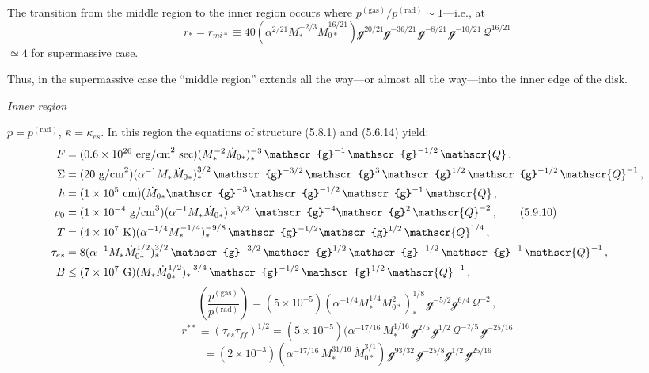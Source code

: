 \begin{equation}
\tag{5.9.8}
\end{equation}

The transition from the middle region to the inner region occurs where
$p^{(\text{gas})}/p^{(\text{rad})} \sim 1$---i.e., at
%
\begin{equation}
\tag{5.9.9}
r_* = r_{mi*} \equiv 40(\alpha^{2/21} M_*^{-2/3} \dot{M}_{0*}^{16/21})
\mathscr{g}^{20/21}\mathscr{g}^{-36/21}\,\mathscr{g}^{-8/21}\,\mathscr{g}^{-10/21}\,\mathscr{Q}^{16/21}
\end{equation}
%
$\simeq 4$ for supermassive case.

Thus, in the supermassive case the ``middle region'' extends all the way---or
almost all the way---into the inner edge of the disk.

\medskip
\noindent
\textit{Inner region}

\noindent
$p = p^{(\text{rad})}$, $\bar{\kappa} = \kappa_{es}$.  In this region the equations of structure (5.8.1) and (5.6.14)
yield:
%
\begin{align}
F &= (0.6 \times 10^{26}~\text{erg/cm}^2~\text{sec})(M_*^{-2} \dot{M}_{0*})_*^{-3}\,\mathscr{g}^{-1}\,\mathscr{g}^{-1/2}\,\mathscr{Q}\,,
\notag\\
\Sigma &= (20~\text{g/cm}^2)(\alpha^{-1}M_*\dot{M}_{0*})_*^{3/2}\,\mathscr{g}^{-3/2}\,\mathscr{g}^{3}\,\mathscr{g}^{1/2}\,\mathscr{g}^{-1/2}\,\mathscr{Q}^{-1}\,,
\notag\\
h &= (1 \times 10^5~\text{cm})(\dot{M}_{0*}\mathscr{g}^{-3}\,\mathscr{g}^{-1/2}\,\mathscr{g}^{-1}\,\mathscr{Q}\,,
\notag\\
\rho_0 &= (1 \times 10^{-4}~\text{g/cm}^3)(\alpha^{-1}M_*\dot{M}_{0*})*^{3/2}\,\mathscr{g}^{-4}\mathscr{g}^{2}\,\mathscr{Q}^{-2}\,,
\tag{5.9.10}\\
T &= (4 \times 10^7~\text{K})(\alpha^{-1/4}M_*^{-1/4})_*^{-9/8}\,\mathscr{g}^{-1/2}\mathscr{g}^{1/2}\,\mathscr{Q}^{1/4}\,,
\notag\\
\tau_{es} &= 8(\alpha^{-1}M_*\dot{M}_{0*}^{1/2})_*^{3/2}\,\mathscr{g}^{-3/2}\,\mathscr{g}^{1/2}\,\mathscr{g}^{-1/2}\,\mathscr{g}^{-1}\,\mathscr{Q}^{-1}\,,
\notag\\
B &\leq (7 \times 10^7~\text{G})(M_*\dot{M}_{0*}^{1/2})_*^{-3/4}\,\mathscr{g}^{-1/2}\,\mathscr{g}^{1/2}\,\mathscr{Q}^{-1}\,,
\notag
\end{align}
%
\[
\left(\frac{p^{(\text{gas})}}{p^{(\text{rad})}}\right)
= (5 \times 10^{-5})(\alpha^{-1/4}M_*^{1/4}M_{0*}^{2})_*^{1/8}\,\mathscr{g}^{-5/2}\mathscr{g}^{6/4}\,\mathscr{Q}^{-2}\,,
\]
%
\[
r^{**} \equiv (\tau_{es}\tau_{ff})^{1/2}
= (5 \times 10^{-5})(\alpha^{-17/16}\,M_*^{1/16}\,\mathscr{g}^{2/5}\,\mathscr{g}^{1/2}\,\mathscr{Q}^{-2/5}\,\mathscr{g}^{-25/16}
\]
%
\[
= (2 \times 10^{-3})(\alpha^{-17/16}\,M_*^{31/16}\,\dot{M}_{0*}^{3/1})
\,\mathscr{g}^{93/32}\,\mathscr{g}^{-25/8}\mathscr{g}^{1/2}\,\mathscr{g}^{25/16}
\]

